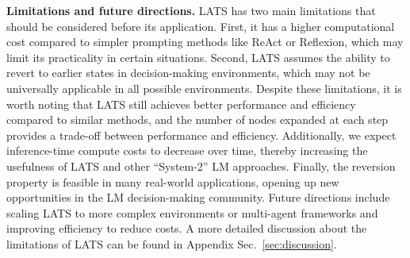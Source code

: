 \documentclass{article}
\theoremstyle{plain}
\theoremstyle{definition}
\theoremstyle{remark}
\begin{document}
\vspace{1.2mm}
{\textbf{Limitations and future directions.} LATS has two main limitations that should be considered before its application. First, it has a higher computational cost compared to simpler prompting methods like ReAct or Reflexion, which may limit its practicality in certain situations. Second, LATS assumes the ability to revert to earlier states in decision-making environments, which may not be universally applicable in all possible environments. Despite these limitations, it is worth noting that LATS still achieves better performance and efficiency compared to similar methods, and the number of nodes expanded at each step provides a trade-off between performance and efficiency. Additionally, we expect inference-time compute costs to decrease over time, thereby increasing the usefulness of LATS and other ``System-2'' LM approaches. Finally, the reversion property is feasible in many real-world applications, opening up new opportunities in the LM decision-making community. Future directions include scaling LATS to more complex environments or multi-agent frameworks and improving efficiency to reduce costs. A more detailed discussion about the limitations of LATS can be found in Appendix Sec.~\ref{sec:discussion}.}


\newpage
\end{document}
